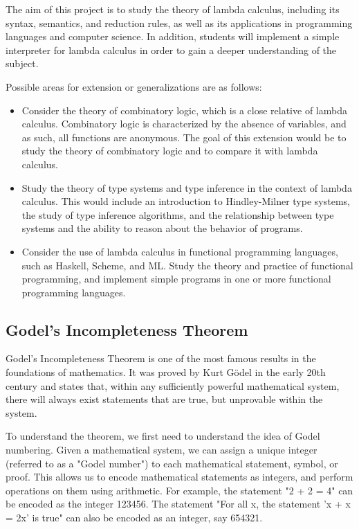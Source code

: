 \documentclass{article}
\begin{document}
\vspace{3mm}
The aim of this project is to study the theory of lambda calculus, including its syntax, semantics, and reduction rules, as well as its applications in programming languages and computer science. In addition, students will implement a simple interpreter for lambda calculus in order to gain a deeper understanding of the subject.

\vspace{3mm}
Possible areas for extension or generalizations are as follows:
\begin{itemize}
\item Consider the theory of combinatory logic, which is a close relative of lambda calculus. Combinatory logic is characterized by the absence of variables, and as such, all functions are anonymous. The goal of this extension would be to study the theory of combinatory logic and to compare it with lambda calculus.
\item Study the theory of type systems and type inference in the context of lambda calculus. This would include an introduction to Hindley-Milner type systems, the study of type inference algorithms, and the relationship between type systems and the ability to reason about the behavior of programs.
\item Consider the use of lambda calculus in functional programming languages, such as Haskell, Scheme, and ML. Study the theory and practice of functional programming, and implement simple programs in one or more functional programming languages.
\end{itemize}

\pagebreak 

\subsection*{Godel's Incompleteness Theorem}

Godel's Incompleteness Theorem is one of the most famous results in the foundations of mathematics. It was proved by Kurt Gödel in the early 20th century and states that, within any sufficiently powerful mathematical system, there will always exist statements that are true, but unprovable within the system.

\vspace{3mm}
To understand the theorem, we first need to understand the idea of Godel numbering. Given a mathematical system, we can assign a unique integer (referred to as a "Godel number") to each mathematical statement, symbol, or proof. This allows us to encode mathematical statements as integers, and perform operations on them using arithmetic. For example, the statement "2 + 2 = 4" can be encoded as the integer 123456. The statement "For all x, the statement 'x + x = 2x' is true" can also be encoded as an integer, say 654321.
\end{document}
